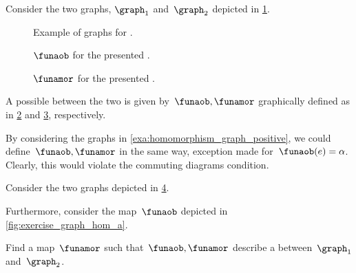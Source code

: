 \begin{example}
    \label{exa:homomorphism_graph_positive}
    Consider the two graphs, $\graph_1$ and~$\graph_2$ depicted in \cref{fig:ex_graph_homom}.
    \begin{figure}[h]
        \centering
        \caption{Example of graphs for .}
        \label{fig:ex_graph_homom}
    \end{figure}

    \begin{figure}[h]
        \centering
        \caption{$\funaob$ for the presented .}
        \label{fig:graph_homo_a}
    \end{figure}

    \begin{figure}[h]
        \centering
        \caption{$\funamor$ for the presented .}
        \label{fig:graph_homo_b}
    \end{figure}

    A possible  between the two is given by~$\funaob,\funamor$ graphically defined as in \cref{fig:graph_homo_a} and \cref{fig:graph_homo_b}, respectively.
\end{example}

\begin{example}[Counterexample]
    By considering the graphs in \cref{exa:homomorphism_graph_positive}, we could define~$\funaob,\funamor$ in the same way, exception made for~$\funaob(e)=\alpha$.
    Clearly, this would violate the commuting diagrams condition.
\end{example}

\begin{exercise}
    Consider the two graphs depicted in \cref{fig:ex_graph_hom}.
    \begin{figure}[h]
        \centering
        \caption{
            \label{fig:ex_graph_hom}}
    \end{figure}
    \begin{marginfigure}
        \centering
        \caption{}
        \label{fig:exercise_graph_hom_a}
    \end{marginfigure}
    Furthermore, consider the map~$\funaob$ depicted in \cref{fig:exercise_graph_hom_a}.

    Find a map~$\funamor$ such that~$\funaob,\funamor$ describe a  between~$\graph_1$ and~$\graph_2$.
\end{exercise}

